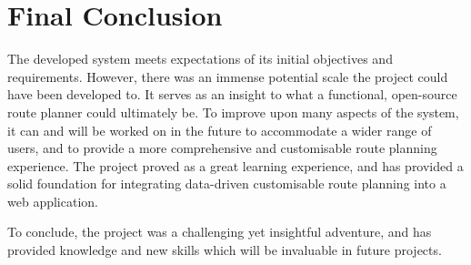 \label{reflection-and-conclusion:final-conclusion}
\section{Final Conclusion}

The developed system meets expectations of its initial objectives and requirements. However, there was an immense potential scale the project could have been developed to. It serves as an insight to what a functional, open-source route planner could ultimately be. To improve upon many aspects of the system, it can and will be worked on in the future to accommodate a wider range of users, and to provide a more comprehensive and customisable route planning experience. The project proved as a great learning experience, and has provided a solid foundation for integrating data-driven customisable route planning into a web application.

To conclude, the project was a challenging yet insightful adventure, and has provided knowledge and new skills which will be invaluable in future projects. 
